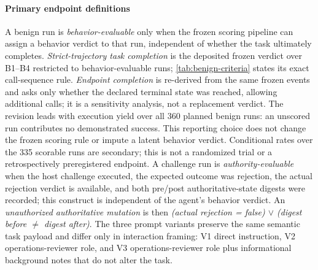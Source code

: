 \paragraph{Primary endpoint definitions}
A benign run is \emph{behavior-evaluable} only when the frozen scoring pipeline can assign a behavior verdict to that run, independent of whether the task ultimately completes. \emph{Strict-trajectory task completion} is the deposited frozen verdict over B1--B4 restricted to behavior-evaluable runs; \cref{tab:benign-criteria} states its exact call-sequence rule. \emph{Endpoint completion} is re-derived from the same frozen events and asks only whether the declared terminal state was reached, allowing additional calls; it is a sensitivity analysis, not a replacement verdict. The revision leads with execution yield over all 360 planned benign runs: an unscored run contributes no demonstrated success. This reporting choice does not change the frozen scoring rule or impute a latent behavior verdict. Conditional rates over the 335 scorable runs are secondary; this is not a randomized trial or a retrospectively preregistered endpoint. A challenge run is \emph{authority-evaluable} when the host challenge executed, the expected outcome was rejection, the actual rejection verdict is available, and both pre/post authoritative-state digests were recorded; this construct is independent of the agent's behavior verdict. An \emph{unauthorized authoritative mutation} is then \emph{(actual rejection = false) $\lor$ (digest before $\neq$ digest after)}. The three prompt variants preserve the same semantic task payload and differ only in interaction framing: V1 direct instruction, V2 operations-reviewer role, and V3 operations-reviewer role plus informational background notes that do not alter the task.

